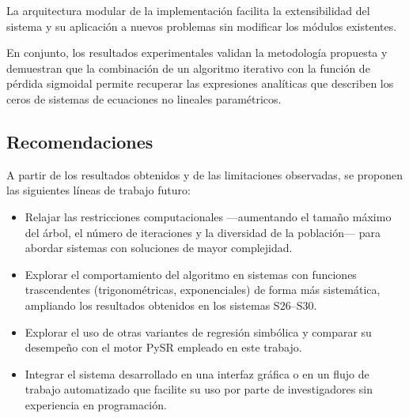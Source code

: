 \documentclass{article} \usepackage[utf8]{inputenc} \usepackage[spanish]{babel} \usepackage{amsmath, amssymb, amsthm} \usepackage{bm} \usepackage{float} \usepackage{longtable} \usepackage[hidelinks]{hyperref}
\begin{document}
La arquitectura modular de la implementación facilita la extensibilidad del sistema y su aplicación a nuevos problemas sin modificar los módulos existentes.

En conjunto, los resultados experimentales validan la metodología propuesta y demuestran que la combinación de un algoritmo iterativo con la función de pérdida sigmoidal permite recuperar las expresiones analíticas que describen los ceros de sistemas de ecuaciones no lineales paramétricos.

\newpage \subsection*{Recomendaciones}

A partir de los resultados obtenidos y de las limitaciones observadas, se proponen las siguientes líneas de trabajo futuro:

\begin{itemize} \item Relajar las restricciones computacionales —aumentando el tamaño máximo del árbol, el número de iteraciones y la diversidad de la población— para abordar sistemas con soluciones de mayor complejidad.

\item Explorar el comportamiento del algoritmo en sistemas con funciones trascendentes (trigonométricas, exponenciales) de forma más sistemática, ampliando los resultados obtenidos en los sistemas S26--S30.

\item Explorar el uso de otras variantes de regresión simbólica y comparar su desempeño con el motor PySR empleado en este trabajo.

\item Integrar el sistema desarrollado en una interfaz gráfica o en un flujo de trabajo automatizado que facilite su uso por parte de investigadores sin experiencia en programación. 
\end{itemize} \newpage   
\end{document}
